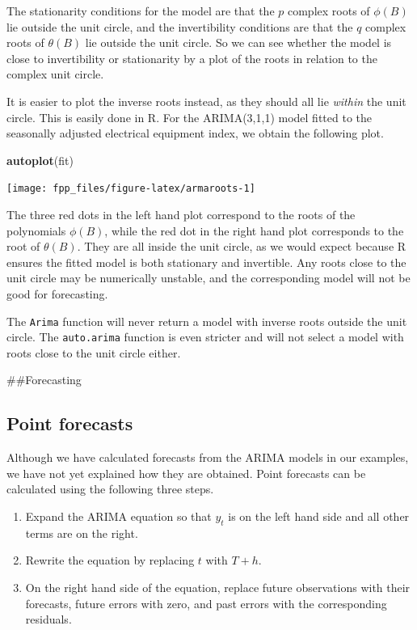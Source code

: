 \documentclass[]{book}
\newenvironment{Shaded}{\begin{snugshade}}{\end{snugshade}}
\newcommand{\KeywordTok}[1]{\textcolor[rgb]{0.13,0.29,0.53}{\textbf{#1}}}
\newcommand{\NormalTok}[1]{#1}
\providecommand{\tightlist}{%
  \setlength{\itemsep}{0pt}\setlength{\parskip}{0pt}}
\begin{document}
The stationarity conditions for the model are that the \(p\) complex roots of \(\phi(B)\) lie outside the unit circle, and the invertibility conditions are that the \(q\) complex roots of \(\theta(B)\) lie outside the unit circle. So we can see whether the model is close to invertibility or stationarity by a plot of the roots in relation to the complex unit circle.

It is easier to plot the inverse roots instead, as they should all lie \emph{within} the unit circle. This is easily done in R. For the ARIMA(3,1,1) model fitted to the seasonally adjusted electrical equipment index, we obtain the following plot.

\begin{Shaded}
\begin{Highlighting}[]
\KeywordTok{autoplot}\NormalTok{(fit)}
\end{Highlighting}
\end{Shaded}

\begin{center}\texttt{[image: fpp\_files/figure-latex/armaroots-1]} \end{center}

The three red dots in the left hand plot correspond to the roots of the polynomials \(\phi(B)\), while the red dot in the right hand plot corresponds to the root of \(\theta(B)\). They are all inside the unit circle, as we would expect because R ensures the fitted model is both stationary and invertible. Any roots close to the unit circle may be numerically unstable, and the corresponding model will not be good for forecasting.

The \texttt{Arima} function will never return a model with inverse roots outside the unit circle. The \texttt{auto.arima} function is even stricter and will not select a model with roots close to the unit circle either.

\#\#Forecasting

\hypertarget{point-forecasts}{%
\subsection*{Point forecasts}\label{point-forecasts}}

Although we have calculated forecasts from the ARIMA models in our examples, we have not yet explained how they are obtained. Point forecasts can be calculated using the following three steps.

\begin{enumerate}
\def\labelenumi{\arabic{enumi}.}
\tightlist
\item
  Expand the ARIMA equation so that \(y_t\) is on the left hand side and all other terms are on the right.
\item
  Rewrite the equation by replacing \(t\) with \(T+h\).
\item
  On the right hand side of the equation, replace future observations with their forecasts, future errors with zero, and past errors with the corresponding residuals.
\end{enumerate}
\end{document}
